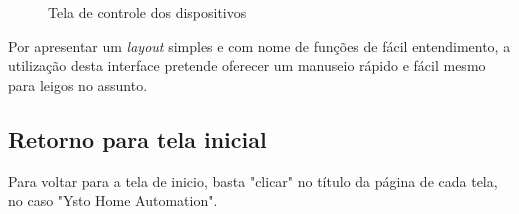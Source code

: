 \begin{figure}[H]
\caption{\label{ui-handle-device} Tela de controle dos dispositivos}
\end{figure}

Por apresentar um \textit{layout} simples e com nome de funções de fácil entendimento, a utilização desta interface pretende oferecer um manuseio rápido e fácil mesmo para leigos no assunto.

\subsection{Retorno para tela inicial}
Para voltar para a tela de inicio, basta "clicar" no título da página de cada tela, no caso "Ysto Home Automation".